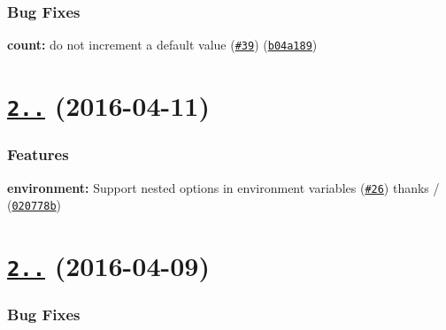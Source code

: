 \subsubsection*{Bug Fixes}


\begin{DoxyItemize}
\item {\bfseries count\+:} do not increment a default value (\href{https://github.com/yargs/yargs-parser/issues/39}{\tt \#39}) (\href{https://github.com/yargs/yargs-parser/commit/b04a189}{\tt b04a189})
\end{DoxyItemize}

\label{_2.4.0}%
 \section*{\href{https://github.com/yargs/yargs-parser/compare/v2.3.0...v2.4.0}{\tt 2..} (2016-\/04-\/11)}

\subsubsection*{Features}


\begin{DoxyItemize}
\item {\bfseries environment\+:} Support nested options in environment variables (\href{https://github.com/yargs/yargs-parser/issues/26}{\tt \#26}) thanks \href{https://github.com/elas7}{\tt } / (\href{https://github.com/yargs/yargs-parser/commit/020778b}{\tt 020778b})
\end{DoxyItemize}

\label{_2.3.0}%
 \section*{\href{https://github.com/yargs/yargs-parser/compare/v2.2.0...v2.3.0}{\tt 2..} (2016-\/04-\/09)}

\subsubsection*{Bug Fixes}


